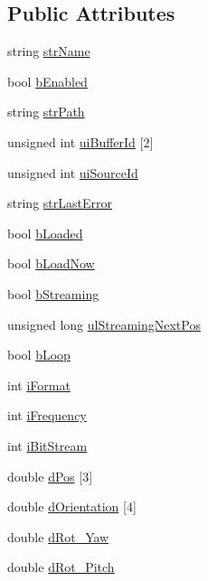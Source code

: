 \subsection*{Public Attributes}
\begin{DoxyCompactItemize}
\item 
string \hyperlink{classs13_sound_a9b8c42dffe53e718d3ab9478880fd82d}{str\-Name}
\item 
bool \hyperlink{classs13_sound_acf7c47ea96f4e61b1a0bc1a8cbd2c26a}{b\-Enabled}
\item 
string \hyperlink{classs13_sound_ad4860e1fd6ea18e0f7fe4c8edaf9d1ed}{str\-Path}
\item 
unsigned int \hyperlink{classs13_sound_a6284bb7e2824b610798c58e1a6e87953}{ui\-Buffer\-Id} \mbox{[}2\mbox{]}
\item 
unsigned int \hyperlink{classs13_sound_a400265e13e002a318cbf28e7838ef4e9}{ui\-Source\-Id}
\item 
string \hyperlink{classs13_sound_a6805b61bfcb66eae45d869169e28835e}{str\-Last\-Error}
\item 
bool \hyperlink{classs13_sound_ae9599ee7f25d919b73db244e8571f28e}{b\-Loaded}
\item 
bool \hyperlink{classs13_sound_ab1a881f7f998787fe95f6491da6a26de}{b\-Load\-Now}
\item 
bool \hyperlink{classs13_sound_a109f81c7265aa5581a4cbaabb9e8bfdb}{b\-Streaming}
\item 
unsigned long \hyperlink{classs13_sound_a3cc9ad36364c61a79b0572b58e9f488d}{ul\-Streaming\-Next\-Pos}
\item 
bool \hyperlink{classs13_sound_aed6c263295b17e4cff067cf824497ced}{b\-Loop}
\item 
int \hyperlink{classs13_sound_a099fd23daee9c224172d8a02fd0befd2}{i\-Format}
\item 
int \hyperlink{classs13_sound_aa338a884838d270a786d8b2f62abca4e}{i\-Frequency}
\item 
int \hyperlink{classs13_sound_a28310cda35e4ffe7d7aa4a56d9e29f59}{i\-Bit\-Stream}
\item 
double \hyperlink{classs13_sound_a70e09d653d97b0f1ba3d923ec86442ad}{d\-Pos} \mbox{[}3\mbox{]}
\item 
double \hyperlink{classs13_sound_a5a72709e7f5fa2a4e24f354f4fc78800}{d\-Orientation} \mbox{[}4\mbox{]}
\item 
double \hyperlink{classs13_sound_adf4be8a514e08981647a8cc3c3a32904}{d\-Rot\-\_\-\-Yaw}
\item 
double \hyperlink{classs13_sound_a5da28a01995195ef8371dd8852a02ecd}{d\-Rot\-\_\-\-Pitch}

\end{DoxyCompactItemize}

